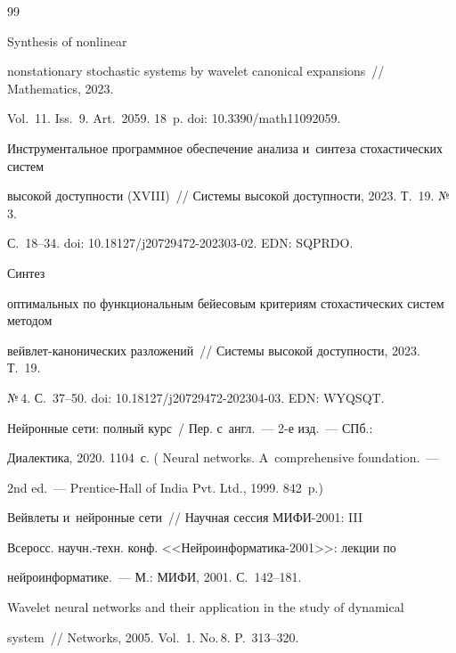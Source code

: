 {{\begin{thebibliography}{99}


 Synthesis of nonlinear 


nonstationary stochastic systems by wavelet canonical expansions~/\!\!/ Mathematics, 2023. 


Vol.~11. Iss.~9. Art.~2059. 18~p.  doi: 10.3390\!/\!math11092059.






Инструментальное программное обеспечение анализа и~синтеза стохастических сис\-тем 


высокой доступности (XVIII)~/\!\!/ Системы высокой доступности, 2023. Т.~19. №\,3.  


С.~18--34. doi: 10.18127\!/\!j20729472-202303-02. EDN: SQPRDO.




   Синтез 


оптимальных по функциональным бейесовым критериям стохастических систем методом  


вейв\-лет-ка\-но\-ни\-че\-ских разложений~/\!\!/ Системы высокой доступности, 2023. Т.~19. 


№\,4. С.~37--50.  doi: 10.18127\!/\!j20729472-202304-03. EDN: WYQSQT.




 Нейронные сети: полный курс~/ Пер. с~англ.~--- 2-е изд.~--- СПб.: 


Диалектика, 2020. 1104~с. ( Neural networks. A~comprehensive foundation.~--- 


2nd ed.~--- Prentice-Hall of India Pvt. Ltd., 1999. 842~p.)




 Вейвлеты и~нейронные сети~/\!\!/ Научная сессия МИФИ-2001: III 


Всеросс. научн.-техн. конф. <<Нейроинформатика-2001>>: лекции по 


 нейроинформатике.~--- М.: МИФИ, 2001. С.~142--181.




 Wavelet neural networks and their application in the study of dynamical 


system~/\!\!/ Networks, 2005. Vol.~1. No.\,8. P.~313--320.





     \end{thebibliography}


} }











